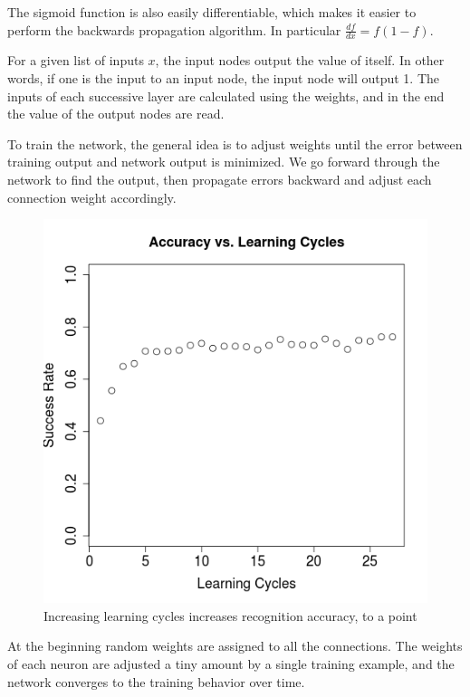 \documentclass[11pt,a4paper]{article}
\begin{document}
The sigmoid function is also easily differentiable, which makes it easier to perform the backwards propagation algorithm. In particular $\frac{df}{dx} = f(1-f)$.

For a given list of inputs $x$, the input nodes output the value of itself. In other words, if one is the input to an input node, the input node will output 1. The inputs of each successive layer are calculated using the weights, and in the end the value of the output nodes are read.

To train the network, the general idea is to adjust weights until the error between training output and network output is minimized. We go forward through the network to find the output, then propagate errors backward and adjust each connection weight accordingly.

\begin{figure}
  \begin{center}
	\includegraphics[scale=0.5]{graph.png}
  \end{center}
  \caption{Increasing learning cycles increases recognition accuracy, to a point}
\end{figure}

At the beginning random weights are assigned to all the connections. The weights of each neuron are adjusted a tiny amount by a single training example, and the network converges to the training behavior over time.
\end{document}
